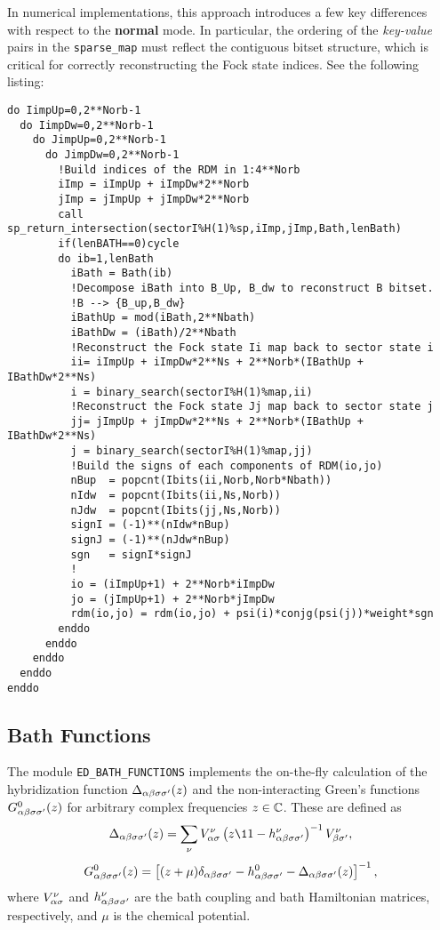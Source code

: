 \documentclass[edipack2.tex]{subfiles}
\begin{document}
  
In numerical implementations, this approach introduces a few 
key differences with respect to the {\bf normal} mode.
In particular, the 
ordering of the \emph{key-value} pairs in the {\tt sparse\_map} 
must reflect the contiguous bitset structure, which is critical 
for correctly reconstructing the Fock state indices.
See the following listing:
\begin{lstlisting}[style=fstyle,numbers=none,basicstyle={\scriptsize\ttfamily}]
do IimpUp=0,2**Norb-1
  do IimpDw=0,2**Norb-1
    do JimpUp=0,2**Norb-1
      do JimpDw=0,2**Norb-1
        !Build indices of the RDM in 1:4**Norb
        iImp = iImpUp + iImpDw*2**Norb
        jImp = jImpUp + jImpDw*2**Norb
        call sp_return_intersection(sectorI%H(1)%sp,iImp,jImp,Bath,lenBath)
        if(lenBATH==0)cycle
        do ib=1,lenBath
          iBath = Bath(ib)
          !Decompose iBath into B_Up, B_dw to reconstruct B bitset. 
          !B --> {B_up,B_dw}
          iBathUp = mod(iBath,2**Nbath)
          iBathDw = (iBath)/2**Nbath
          !Reconstruct the Fock state Ii map back to sector state i
          ii= iImpUp + iImpDw*2**Ns + 2**Norb*(IBathUp + IBathDw*2**Ns)
          i = binary_search(sectorI%H(1)%map,ii)
          !Reconstruct the Fock state Jj map back to sector state j
          jj= jImpUp + jImpDw*2**Ns + 2**Norb*(IBathUp + IBathDw*2**Ns)
          j = binary_search(sectorI%H(1)%map,jj)
          !Build the signs of each components of RDM(io,jo)
          nBup  = popcnt(Ibits(ii,Norb,Norb*Nbath))
          nIdw  = popcnt(Ibits(ii,Ns,Norb))
          nJdw  = popcnt(Ibits(jj,Ns,Norb))
          signI = (-1)**(nIdw*nBup)
          signJ = (-1)**(nJdw*nBup)
          sgn   = signI*signJ
          !  
          io = (iImpUp+1) + 2**Norb*iImpDw
          jo = (jImpUp+1) + 2**Norb*jImpDw
          rdm(io,jo) = rdm(io,jo) + psi(i)*conjg(psi(j))*weight*sgn
        enddo
      enddo
    enddo
  enddo
enddo
\end{lstlisting}


\subsection{Bath Functions}\label{sSecFunc}
The module {\tt ED\_BATH\_FUNCTIONS} implements the on-the-fly 
calculation of the hybridization function 
$\Delta_{\alpha\beta\sigma\sigma'}(z)$ and the non-interacting Green's functions 
$G^0_{\alpha\beta\sigma\sigma'}(z)$ for arbitrary complex frequencies $z \in \mathbb{C}$. 
These are defined as
\begin{equation}
\Delta_{\a\b\s\s'}(z) = \sum_\nu V^\nu_{\a\s} 
\left( z\11 - h^\nu_{\a\b\s\s'} \right)^{-1} V^\nu_{\b\s'},
\end{equation}
\begin{equation}
G^0_{\alpha\beta\sigma\sigma'}(z) = 
\left[ (z + \mu)\delta_{\alpha\beta\sigma\sigma'} - h^0_{\alpha\beta\sigma\sigma'} - 
\Delta_{\alpha\beta\sigma\sigma'}(z) \right]^{-1},
\end{equation}
where $V^\nu_{\alpha\sigma}$ and $h^\nu_{\alpha\beta\sigma\sigma'}$ are the bath coupling 
and bath Hamiltonian matrices, respectively, and $\mu$ is the chemical 
potential.
\end{document}
